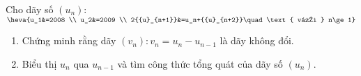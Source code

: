 \begin{bt}%
	Cho dãy số $(u_n)$: $ \heva{u_1&=2008 \\  u_2&=2009 \\ 2{{u}_{n+1}}&=u_n+{{u}_{n+2}}\quad \text{ với } n\ge 1}$
	\begin{enumerate}
		\item Chứng minh rằng dãy $(v_n): v_n=u_n-{{u}_{n-1}}$ là dãy không đổi.
		\item Biểu thị $u_n$ qua $u_{n-1}$ và tìm công thức tổng quát của dãy số $(u_n)$.
	\end{enumerate}
\end{bt}

